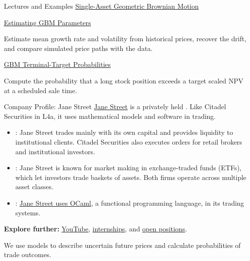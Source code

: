 \documentclass[aspectratio=169,11pt]{beamer}
\begin{document}
\begin{frame}{Lectures and Examples}
  \textbf{}
  \href{https://github.com/varnerlab/CHEME-5660-CourseRepository-Fall-2026/blob/main/lectures/week-4/L4b/CHEME-5660-L4b-Lecture-SingleAsset-GeometricBrownianMotion-TradeRule-Fall-2026.ipynb}{Single-Asset Geometric Brownian Motion}

  \vspace{1.1em}
  \textbf{}
  \href{https://github.com/varnerlab/CHEME-5660-CourseRepository-Fall-2026/blob/main/lectures/week-4/L4b/CHEME-5660-L4b-Example-Parameters-SAGBM-Fall-2026.ipynb}{Estimating GBM Parameters}

  Estimate mean growth rate and volatility from historical prices, recover the
  drift, and compare simulated price paths with the data.

  \vspace{1.1em}
  \textbf{}
  \href{https://github.com/varnerlab/CHEME-5660-CourseRepository-Fall-2026/blob/main/lectures/week-5/L5a/CHEME-5660-L5a-Example-GBM-NPV-TradeRule-Fall-2026.ipynb}{GBM Terminal-Target Probabilities}

  Compute the probability that a long stock position exceeds a target scaled
  NPV at a scheduled sale time.
\end{frame}

\begin{frame}{Company Profile: Jane Street}
  \href{https://www.janestreet.com/}{Jane Street} is a privately held
  . Like Citadel Securities in L4a, it
  uses mathematical models and software in trading.

  \vspace{0.25em}
  \begin{itemize}\setlength{\itemsep}{0.5em}
    \item {}: Jane Street trades mainly with its own
      capital and provides liquidity to institutional clients. Citadel Securities
      also executes orders for retail brokers and institutional investors.
    \item {}: Jane Street is known for market making in
      exchange-traded funds (ETFs), which let investors trade baskets of assets.
      Both firms operate across multiple asset classes.
    \item {}: \href{https://www.janestreet.com/technology/}{Jane Street uses OCaml}, a functional programming
      language, in its trading systems.
  \end{itemize}

  \vspace{0.25em}
  \textbf{Explore further:}
  \href{https://www.youtube.com/@janestreet}{YouTube},
  \href{https://www.janestreet.com/join-jane-street/internships/}{internships}, and
  \href{https://www.janestreet.com/join-jane-street/open-roles/}{open positions}.

  \vspace{0.25em}
  We use models to describe uncertain future prices and calculate
  probabilities of trade outcomes.
\end{frame}
\end{document}
